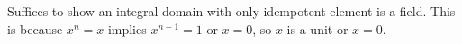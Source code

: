 Suffices to show an integral domain with only idempotent element is a field. This is because $x^n=x$ implies $x^{n-1}=1$ or $x=0$, so $x$ is a unit or $x=0$.
